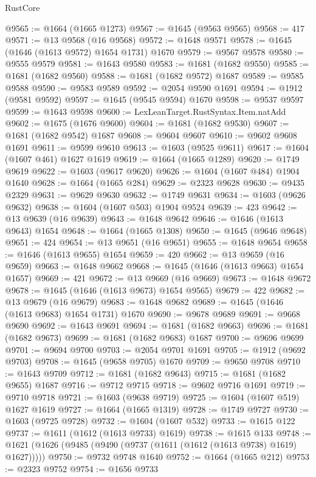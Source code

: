 \begin{lexlean}{RustCore}
\begin{coremodule}
@9565 := @1664 (@1665 @1273)
@9567 := @1645 (@9563 @9565)
@9568 := 417
@9571 := @13 @9568 (@16 @9568)
@9572 := @1648 @9571
@9578 := @1645 (@1646 (@1613 @9572) @1654 @1731) @1670
@9579 := @9567 @9578
@9580 := @9555 @9579
@9581 := @1643 @9580
@9583 := @1681 (@1682 @9550)
@9585 := @1681 (@1682 @9560)
@9588 := @1681 (@1682 @9572) @1687
@9589 := @9585 @9588
@9590 := @9583 @9589
@9592 := @2054 @9590 @1691
@9594 := @1912 (@9581 @9592)
@9597 := @1645 (@9545 @9594) @1670
@9598 := @9537 @9597
@9599 := @1643 @9598
@9600 := LexLeanTarget.RustSyntax.Item.natAdd
@9602 := @1675 (@1676 @9600)
@9604 := @1681 (@1682 @9530)
@9607 := @1681 (@1682 @9542) @1687
@9608 := @9604 @9607
@9610 := @9602 @9608 @1691
@9611 := @9599 @9610
@9613 := @1603 (@9525 @9611)
@9617 := @1604 (@1607 @461) @1627 @1619
@9619 := @1664 (@1665 @1289)
@9620 := @1749 @9619
@9622 := @1603 (@9617 @9620)
@9626 := @1604 (@1607 @484) @1904 @1640
@9628 := @1664 (@1665 @284)
@9629 := @2323 @9628
@9630 := @9435 @2329
@9631 := @9629 @9630
@9632 := @1749 @9631
@9634 := @1603 (@9626 @9632)
@9638 := @1604 (@1607 @503) @1904 @9524
@9639 := 423
@9642 := @13 @9639 (@16 @9639)
@9643 := @1648 @9642
@9646 := @1646 (@1613 @9643) @1654
@9648 := @1664 (@1665 @1308)
@9650 := @1645 (@9646 @9648)
@9651 := 424
@9654 := @13 @9651 (@16 @9651)
@9655 := @1648 @9654
@9658 := @1646 (@1613 @9655) @1654
@9659 := 420
@9662 := @13 @9659 (@16 @9659)
@9663 := @1648 @9662
@9668 := @1645 (@1646 (@1613 @9663) @1654 @1657)
@9669 := 421
@9672 := @13 @9669 (@16 @9669)
@9673 := @1648 @9672
@9678 := @1645 (@1646 (@1613 @9673) @1654 @9565)
@9679 := 422
@9682 := @13 @9679 (@16 @9679)
@9683 := @1648 @9682
@9689 := @1645 (@1646 (@1613 @9683) @1654 @1731) @1670
@9690 := @9678 @9689
@9691 := @9668 @9690
@9692 := @1643 @9691
@9694 := @1681 (@1682 @9663)
@9696 := @1681 (@1682 @9673)
@9699 := @1681 (@1682 @9683) @1687
@9700 := @9696 @9699
@9701 := @9694 @9700
@9703 := @2054 @9701 @1691
@9705 := @1912 (@9692 @9703)
@9708 := @1645 (@9658 @9705) @1670
@9709 := @9650 @9708
@9710 := @1643 @9709
@9712 := @1681 (@1682 @9643)
@9715 := @1681 (@1682 @9655) @1687
@9716 := @9712 @9715
@9718 := @9602 @9716 @1691
@9719 := @9710 @9718
@9721 := @1603 (@9638 @9719)
@9725 := @1604 (@1607 @519) @1627 @1619
@9727 := @1664 (@1665 @1319)
@9728 := @1749 @9727
@9730 := @1603 (@9725 @9728)
@9732 := @1604 (@1607 @532)
@9733 := @1615 @122
@9737 := @1611 (@1612 (@1613 @9733) @1619)
@9738 := @1615 @133
@9748 := @1621 (@1626 (@9485 (@9490 (@9737 (@1611 (@1612 (@1613 @9738) @1619) @1627)))))
@9750 := @9732 @9748 @1640
@9752 := @1664 (@1665 @212)
@9753 := @2323 @9752
@9754 := @1656 @9733

\end{coremodule}
\end{lexlean}

